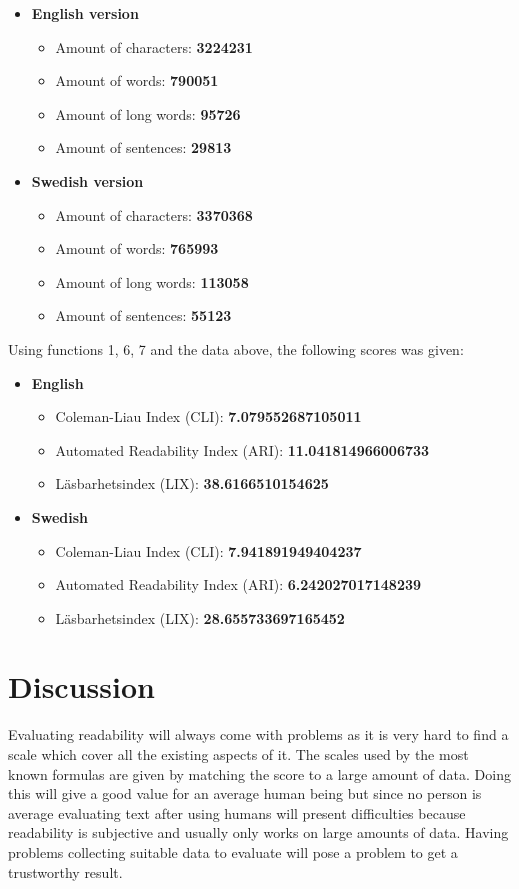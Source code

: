 \documentclass[a4paper]{article}
\begin{document}
\begin{itemize}
	\item \textbf{English version}
	\begin{itemize}
		\item Amount of characters: \textbf{3224231}
		\item Amount of words: \textbf{790051}
		\item Amount of long words: \textbf{95726}
		\item Amount of sentences: \textbf{29813}
	\end{itemize}
	\item \textbf{Swedish version}
	\begin{itemize}
		\item Amount of characters: \textbf{3370368}
		\item Amount of words: \textbf{765993}
		\item Amount of long words: \textbf{113058}
		\item Amount of sentences: \textbf{55123}
	\end{itemize}
\end{itemize}

Using functions 1, 6, 7 and the data above, the following scores was given:

\begin{itemize}
    \item \textbf{English}
    \begin{itemize}
        \item Coleman-Liau Index (CLI): \textbf{7.079552687105011}
        \item Automated Readability Index (ARI): \textbf{11.041814966006733 }
        \item Läsbarhetsindex (LIX): \textbf{38.6166510154625}
    \end{itemize}
    \item \textbf{Swedish}
    \begin{itemize}
        \item Coleman-Liau Index (CLI): \textbf{7.941891949404237}
        \item Automated Readability Index (ARI): \textbf{6.242027017148239}
        \item Läsbarhetsindex (LIX): \textbf{28.655733697165452}
    \end{itemize}
\end{itemize}

\section{Discussion}
Evaluating readability will always come with problems as it is very hard to find a scale which cover all the existing aspects of it. The scales used by the most known formulas are given by matching the score to a large amount of data. Doing this will give a good value for an average human being but since no person is average evaluating text after using humans will present difficulties because readability is subjective and usually only works on large amounts of data. Having problems collecting suitable data to evaluate will pose a problem to get a trustworthy result. 
\end{document}
